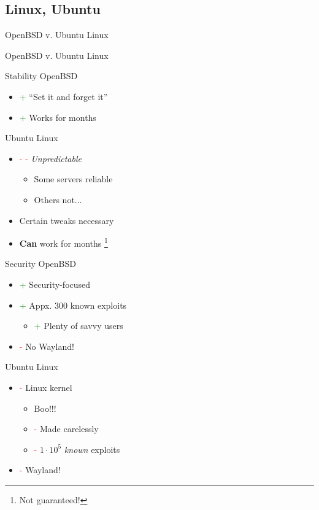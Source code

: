 \documentclass{beamer}
\newcommand{\good}{\textcolor{green}{+ }}
\newcommand{\bad}{\textcolor{red}{- }}
\begin{document}
		\subsection{Linux, Ubuntu}
			\begin{frame}{OpenBSD v. Ubuntu Linux}
				\begin{center}
					OpenBSD v. Ubuntu Linux
				\end{center}
			\end{frame}
			\begin{frame}{Stability}
				OpenBSD
				\begin{itemize}
					\item \good ``Set it and forget it''
					\item \good Works for months
				\end{itemize}
				Ubuntu Linux
				\begin{itemize}
					\item \bad \bad \textit{Unpredictable}
					\begin{itemize}
						\item Some servers reliable
						\item Others not...
					\end{itemize}
					\item Certain tweaks necessary
					\item \textbf{Can} work for months \footnote{Not guaranteed!}
				\end{itemize}
			\end{frame}
			\begin{frame}{Security}
				OpenBSD
				\begin{itemize}
					\item \good Security-focused
					\item \good Appx. 300 known exploits
					\begin{itemize}
						\item \good Plenty of savvy users
					\end{itemize}
					\item \bad No Wayland!
				\end{itemize}
				Ubuntu Linux
				\begin{itemize}
					\item \bad Linux kernel
					\begin{itemize}
						\item Boo!!!
						\item \bad Made carelessly
						\item \bad $1\cdot10^5$ \textit{known} exploits
					\end{itemize}
					\item \bad Wayland!
				\end{itemize}
			\end{frame}
\end{document}
